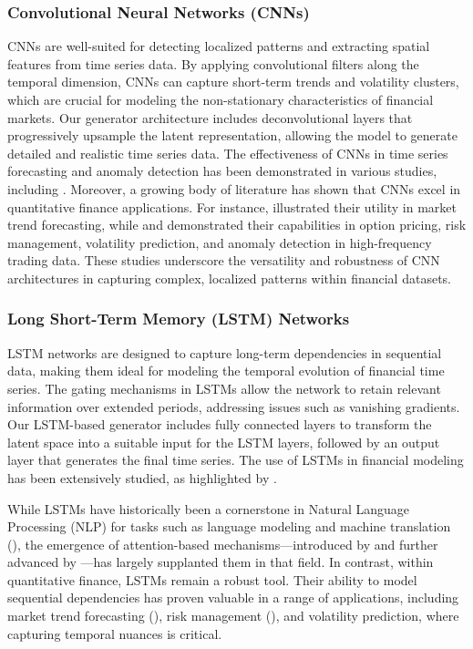 \documentclass{article}
\begin{document}
\subsubsection*{Convolutional Neural Networks (CNNs)}

CNNs are well-suited for detecting localized patterns and extracting spatial features from time series data. By applying convolutional filters along the temporal dimension, CNNs can capture short-term trends and volatility clusters, which are crucial for modeling the non-stationary characteristics of financial markets. Our generator architecture includes deconvolutional layers that progressively upsample the latent representation, allowing the model to generate detailed and realistic time series data. The effectiveness of CNNs in time series forecasting and anomaly detection has been demonstrated in various studies, including \textcite{lecun_deep_2015}. Moreover, a growing body of literature has shown that CNNs excel in quantitative finance applications. For instance, \textcite{dixon_high_2017} illustrated their utility in market trend forecasting, while \textcite{liu_option_2023} and \textcite{zhang_deeplob_2019} demonstrated their capabilities in option pricing, risk management, volatility prediction, and anomaly detection in high-frequency trading data. These studies underscore the versatility and robustness of CNN architectures in capturing complex, localized patterns within financial datasets.

\subsubsection*{Long Short-Term Memory (LSTM) Networks}

LSTM networks are designed to capture long-term dependencies in sequential data, making them ideal for modeling the temporal evolution of financial time series. The gating mechanisms in LSTMs allow the network to retain relevant information over extended periods, addressing issues such as vanishing gradients. Our LSTM-based generator includes fully connected layers to transform the latent space into a suitable input for the LSTM layers, followed by an output layer that generates the final time series. The use of LSTMs in financial modeling has been extensively studied, as highlighted by \textcite{hochreiter_long_1997}.

While LSTMs have historically been a cornerstone in Natural Language Processing (NLP) for tasks such as language modeling and machine translation (\textcite{sutskever_sequence_2014, fischer_deep_2018}), the emergence of attention-based mechanisms—introduced by \textcite{bahdanau_neural_2016} and further advanced by \textcite{vaswani_attention_2023}—has largely supplanted them in that field. In contrast, within quantitative finance, LSTMs remain a robust tool. Their ability to model sequential dependencies has proven valuable in a range of applications, including market trend forecasting (\textcite{fischer_deep_2018}), risk management (\textcite{bao_deep_2017}), and volatility prediction, where capturing temporal nuances is critical.
\end{document}
